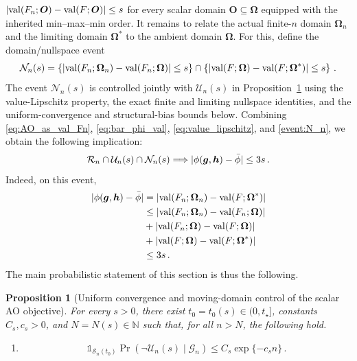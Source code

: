 \documentclass{article}
\makeatletter
\newtheorem{proposition}[theorem]{Proposition}
\theoremstyle{definition}
\newcommand{\abs}[1]{%
	\ensuremath{%
		\if@display
		\left| #1 \right|
		\else
		\lvert #1 \rvert
		\fi
	}%
}
\newcommand*{\bb}{\boldsymbol}
\def\bh{\bb{h}}
\def\bg{\bb{g}}
\makeatother
\begin{document}
\begin{bibunit}
$\abs{\operatorname{val}(F_n;\bb O)-\operatorname{val}(F;\bb O)}
\leq s$
for every scalar domain $\bb O\subseteq\bb\Omega$ equipped with the inherited
min--max--min order.
It remains to relate the actual finite-$n$ domain $\bb\Omega_n$ and the limiting domain $\bb\Omega^*$ to the ambient domain $\bb\Omega$.
For this, define the domain/nullspace event
\begin{equation}
	\label{event:N_n}
	\mathcal N_n(s)
	=
	\left\{
		\abs{
			\operatorname{val}(F_n;\bb\Omega_n)
			-
			\operatorname{val}(F_n;\bb\Omega)
		}
		\leq s
	\right\}
	\cap
	\left\{
		\abs{
			\operatorname{val}(F;\bb\Omega)
			-
			\operatorname{val}(F;\bb\Omega^*)
		}
		\leq s
	\right\}\,.
\end{equation}
The event $\mathcal N_n(s)$ is controlled jointly with
$\mathcal U_n(s)$ in Proposition~\ref{prop:uniform_AO_control} using the
value-Lipschitz property, the exact finite and limiting nullspace identities,
and the uniform-convergence and structural-bias bounds below.
Combining \eqref{eq:AO_as_val_Fn}, \eqref{eq:bar_phi_val}, \eqref{eq:value_lipschitz}, and \eqref{event:N_n}, we obtain the following implication:
\begin{equation}
	\label{eq:AO_value_implication}
	\mathcal R_n
	\cap
	\mathcal U_n(s)
	\cap
	\mathcal N_n(s)
	\Longrightarrow
	\abs{
		\phi(\bg,\bh)-\bar\phi
	}
	\leq 3s\,.
\end{equation}
Indeed, on this event,
$$
\begin{aligned}
	\abs{\phi(\bg,\bh)-\bar\phi}
	&=
	\abs{
		\operatorname{val}(F_n;\bb\Omega_n)
		-
		\operatorname{val}(F;\bb\Omega^*)
	}\\
	&\leq
	\abs{
		\operatorname{val}(F_n;\bb\Omega_n)
		-
		\operatorname{val}(F_n;\bb\Omega)
	}\\
	&+
	\abs{
		\operatorname{val}(F_n;\bb\Omega)
		-
		\operatorname{val}(F;\bb\Omega)
	}\\
	&+
	\abs{
		\operatorname{val}(F;\bb\Omega)
		-
		\operatorname{val}(F;\bb\Omega^*)
	}\\
	&\leq 3s\,.
\end{aligned}
$$
The main probabilistic statement of this section is thus the following.

\begin{proposition}[Uniform convergence and moving-domain control of the scalar AO objective]
\label{prop:uniform_AO_control}
For every $s>0$, there exist
$t_0=t_0(s)\in(0,t_\star]$, constants $C_s,c_s>0$, and
$N=N(s)\in\mathbb N$ such that, for all $n>N$, the following hold.
\begin{enumerate}[label=(\roman*)]
    \item
	\begin{equation}
	\label{eq:uniform_AO_convergence_conditional}
		\mathds{1}_{\mathcal S_n(t_0)}
		\Pr\left(
			\lnot\mathcal U_n(s)
			\mid
			\mathcal G_n
		\right)
		\leq
		C_s\exp\{-c_sn\}\,.
	\end{equation}


\end{enumerate}
\end{proposition}
\end{bibunit}
\end{document}
